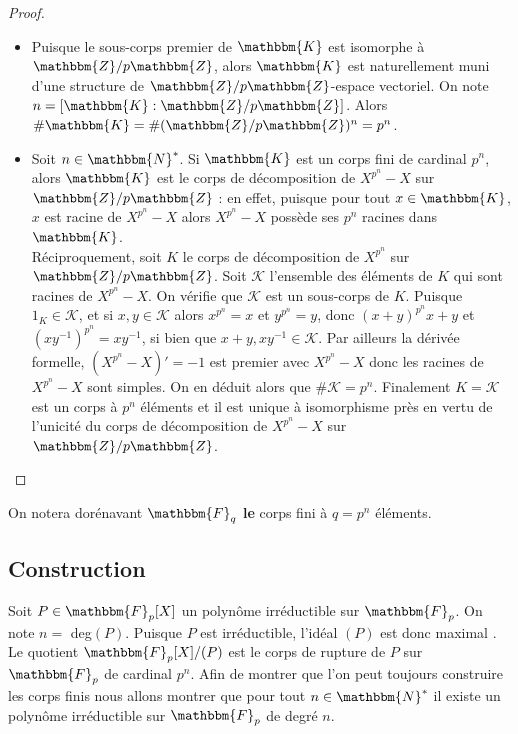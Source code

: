 \documentclass[12pt]{article}
\newcommand{\N}{\mathbbm{N}}
\newcommand{\Z}{\mathbbm{Z}}
\newcommand{\K}{\mathbbm{K}}
\newcommand{\F}{\mathbbm{F}}
\theoremstyle{definition}
\begin{document}
\begin{proof}\hspace{12pt}
\begin{itemize}
\item Puisque le sous-corps premier de $\K$ est isomorphe à $\Z / p \Z$, alors $\K$ est naturellement muni d'une structure de $\Z / p \Z$-espace vectoriel. On note $n = [ \K : \Z / p \Z ]$. Alors $\# \K = \# (\Z / p \Z)^n = p^n$.
\item Soit $n \in \N^{*}$. Si $\K$ est un corps fini de cardinal $p^n$, alors $\K$ est le corps de décomposition de $X^{p^n} - X$ sur $\Z / p \Z$ : en effet, puisque pour tout $x \in \K$, $x$ est racine de $X^{p^n} - X$ alors $X^{p^n} - X$ possède ses $p^n$ racines dans $\K$.\\
Réciproquement, soit $K$ le corps de décomposition de $X^{p^n}$ sur $\Z / p \Z$. Soit $\mathcal{K}$ l'ensemble des éléments de $K$ qui sont racines de $X^{p^n} - X$. On vérifie que $\mathcal{K}$ est un sous-corps de $K$. Puisque $1_K \in \mathcal{K}$, et si $x,y \in \mathcal{K}$ alors $x^{p^n}= x$ et $y^{p^n} = y$, donc $(x+y)^{p^n} x + y$ et $(xy^{-1})^{p^n} = xy^{-1}$, si bien que $x + y, xy^{-1} \in \mathcal{K}$. Par ailleurs la dérivée formelle, $(X^{p^n} - X)' = -1$ est premier avec $X^{p^n} - X$ donc les racines de $X^{p^n} - X$ sont simples. On en déduit alors que $\# \mathcal{K} = p^n$. Finalement $K = \mathcal{K}$ est un corps à $p^n$ éléments et il est unique à isomorphisme près en vertu de l'unicité du corps de décomposition de $X^{p^n} - X$ sur $\Z / p \Z$.
\end{itemize}
\end{proof}
On notera dorénavant $\F_q$ \textbf{le} corps fini à $q = p^n$ éléments.
\subsection{Construction}
Soit $P \in \F_p [X]$ un polynôme irréductible sur $\F_p$. On note $n = $ deg$(P)$. Puisque $P$ est irréductible, l'idéal $(P)$ est donc maximal%
. Le quotient $\F_p [X] / (P)$ est le corps de rupture de $P$ sur $\F_p$ de cardinal $p^n$. Afin de montrer que l'on peut toujours construire les corps finis nous allons montrer que pour tout $n \in \N^{*}$ il existe un polynôme irréductible sur $\F_p$ de degré $n$.
\end{document}

